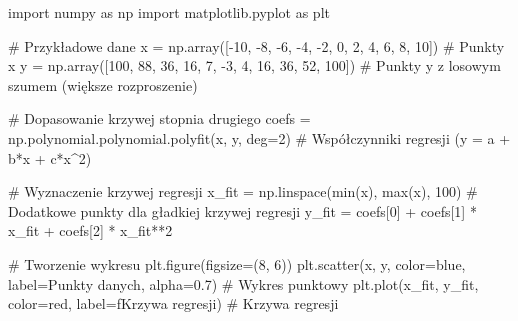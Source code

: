 \documentclass[
  polish,
  letterpaper,
  DIV=11,
  numbers=noendperiod]{scrreprt}
\newenvironment{Shaded}{\begin{snugshade}}{\end{snugshade}}
\newcommand{\BuiltInTok}[1]{\textcolor[rgb]{0.00,0.23,0.31}{#1}}
\newcommand{\CommentTok}[1]{\textcolor[rgb]{0.37,0.37,0.37}{#1}}
\newcommand{\DecValTok}[1]{\textcolor[rgb]{0.68,0.00,0.00}{#1}}
\newcommand{\FloatTok}[1]{\textcolor[rgb]{0.68,0.00,0.00}{#1}}
\newcommand{\ImportTok}[1]{\textcolor[rgb]{0.00,0.46,0.62}{#1}}
\newcommand{\NormalTok}[1]{\textcolor[rgb]{0.00,0.23,0.31}{#1}}
\newcommand{\OperatorTok}[1]{\textcolor[rgb]{0.37,0.37,0.37}{#1}}
\newcommand{\SpecialStringTok}[1]{\textcolor[rgb]{0.13,0.47,0.30}{#1}}
\newcommand{\StringTok}[1]{\textcolor[rgb]{0.13,0.47,0.30}{#1}}
\begin{document}
\begin{Shaded}
\begin{Highlighting}[]
\ImportTok{import}\NormalTok{ numpy }\ImportTok{as}\NormalTok{ np}
\ImportTok{import}\NormalTok{ matplotlib.pyplot }\ImportTok{as}\NormalTok{ plt}

\CommentTok{\# Przykładowe dane}
\NormalTok{x }\OperatorTok{=}\NormalTok{ np.array([}\OperatorTok{{-}}\DecValTok{10}\NormalTok{, }\OperatorTok{{-}}\DecValTok{8}\NormalTok{, }\OperatorTok{{-}}\DecValTok{6}\NormalTok{, }\OperatorTok{{-}}\DecValTok{4}\NormalTok{, }\OperatorTok{{-}}\DecValTok{2}\NormalTok{, }\DecValTok{0}\NormalTok{, }\DecValTok{2}\NormalTok{, }\DecValTok{4}\NormalTok{, }\DecValTok{6}\NormalTok{, }\DecValTok{8}\NormalTok{, }\DecValTok{10}\NormalTok{])  }\CommentTok{\# Punkty x}
\NormalTok{y }\OperatorTok{=}\NormalTok{ np.array([}\DecValTok{100}\NormalTok{, }\DecValTok{88}\NormalTok{, }\DecValTok{36}\NormalTok{, }\DecValTok{16}\NormalTok{, }\DecValTok{7}\NormalTok{, }\OperatorTok{{-}}\DecValTok{3}\NormalTok{, }\DecValTok{4}\NormalTok{, }\DecValTok{16}\NormalTok{, }\DecValTok{36}\NormalTok{, }\DecValTok{52}\NormalTok{, }\DecValTok{100}\NormalTok{])   }\CommentTok{\# Punkty y z losowym szumem (większe rozproszenie)}

\CommentTok{\# Dopasowanie krzywej stopnia drugiego}
\NormalTok{coefs }\OperatorTok{=}\NormalTok{ np.polynomial.polynomial.polyfit(x, y, deg}\OperatorTok{=}\DecValTok{2}\NormalTok{)  }\CommentTok{\# Współczynniki regresji (y = a + b*x + c*x\^{}2)}

\CommentTok{\# Wyznaczenie krzywej regresji}
\NormalTok{x\_fit }\OperatorTok{=}\NormalTok{ np.linspace(}\BuiltInTok{min}\NormalTok{(x), }\BuiltInTok{max}\NormalTok{(x), }\DecValTok{100}\NormalTok{)  }\CommentTok{\# Dodatkowe punkty dla gładkiej krzywej regresji}
\NormalTok{y\_fit }\OperatorTok{=}\NormalTok{ coefs[}\DecValTok{0}\NormalTok{] }\OperatorTok{+}\NormalTok{ coefs[}\DecValTok{1}\NormalTok{] }\OperatorTok{*}\NormalTok{ x\_fit }\OperatorTok{+}\NormalTok{ coefs[}\DecValTok{2}\NormalTok{] }\OperatorTok{*}\NormalTok{ x\_fit}\OperatorTok{**}\DecValTok{2}

\CommentTok{\# Tworzenie wykresu}
\NormalTok{plt.figure(figsize}\OperatorTok{=}\NormalTok{(}\DecValTok{8}\NormalTok{, }\DecValTok{6}\NormalTok{))}
\NormalTok{plt.scatter(x, y, color}\OperatorTok{=}\StringTok{\textquotesingle{}blue\textquotesingle{}}\NormalTok{, label}\OperatorTok{=}\StringTok{\textquotesingle{}Punkty danych\textquotesingle{}}\NormalTok{, alpha}\OperatorTok{=}\FloatTok{0.7}\NormalTok{)  }\CommentTok{\# Wykres punktowy}
\NormalTok{plt.plot(x\_fit, y\_fit, color}\OperatorTok{=}\StringTok{\textquotesingle{}red\textquotesingle{}}\NormalTok{, label}\OperatorTok{=}\SpecialStringTok{f\textquotesingle{}Krzywa regresji\textquotesingle{}}\NormalTok{)  }\CommentTok{\# Krzywa regresji}


\end{Highlighting}
\end{Shaded}
\end{document}
